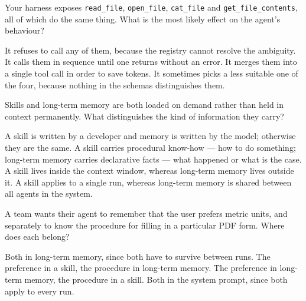 \qitem Your harness exposes \texttt{read\_file}, \texttt{open\_file}, \texttt{cat\_file} and
\texttt{get\_file\_contents}, all of which do the same thing. What is the most likely effect on the agent's
behaviour?
\begin{choices}
  \choice It refuses to call any of them, because the registry cannot resolve the ambiguity.
  \choice It calls them in sequence until one returns without an error.
  \choice It merges them into a single tool call in order to save tokens.
  \CorrectChoice It sometimes picks a less suitable one of the four, because nothing in the schemas distinguishes them.
\end{choices}
\dontknow
{}



\qitem Skills and long-term memory are both loaded on demand rather than held in context permanently.
What distinguishes the kind of information they carry?
\begin{choices}
  \choice A skill is written by a developer and memory is written by the model; otherwise they are the same.
  \CorrectChoice A skill carries procedural know-how --- how to do something; long-term memory carries declarative facts --- what happened or what is the case.
  \choice A skill lives inside the context window, whereas long-term memory lives outside it.
  \choice A skill applies to a single run, whereas long-term memory is shared between all agents in the system.
\end{choices}
\dontknow
{}

\qitem A team wants their agent to remember that the user prefers metric units, and separately to know
the procedure for filling in a particular PDF form. Where does each belong?
\begin{choices}
  \choice Both in long-term memory, since both have to survive between runs.
  \choice The preference in a skill, the procedure in long-term memory.
  \CorrectChoice The preference in long-term memory, the procedure in a skill.
  \choice Both in the system prompt, since both apply to every run.
\end{choices}
\dontknow
{}


